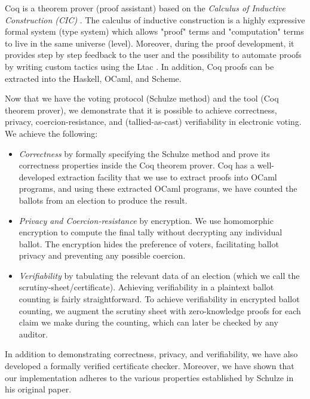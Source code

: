 Coq is a theorem prover (proof assistant) based on the \textit{Calculus of Inductive Construction (CIC)} 
\citep{Coquand:1988:CC:47724.47725} \citep{coquand1988inductively}. 
The calculus of inductive construction is a highly expressive formal system (type system) 
which allows "proof" terms and 
"computation" terms to live in the same universe (level). Moreover, during the proof development, 
it provides step by step feedback to the user and the possibility to automate proofs by 
writing custom tactics using the Ltac \citep{10.5555/1765236.1765246}. In addition, 
Coq proofs can be extracted into the  Haskell, OCaml, and Scheme.
 
Now that we have the voting protocol (Schulze method) and  the tool (Coq theorem prover), 
we demonstrate that it is possible to achieve correctness, privacy, coercion-resistance, and (tallied-as-cast) verifiability in 
electronic voting. We achieve the following:
\begin{itemize}
 \item \textit{Correctness} by formally specifying the Schulze method  and prove its correctness properties
  inside the Coq theorem prover. 
 Coq has a well-developed extraction facility that 
 we use to extract proofs into OCaml programs, and using these extracted OCaml programs, we 
 have counted the ballots from an election to produce the result. 
 \item \textit{Privacy and Coercion-resistance} by encryption. We use homomorphic encryption to compute the 
  final tally without decrypting any individual ballot.  The encryption hides the preference of voters, facilitating 
  ballot privacy and preventing any possible coercion.  
  
\item \textit{Verifiability} by tabulating the relevant data of an election (which we call the scrutiny-sheet/certificate).
   Achieving verifiability in a plaintext ballot counting is fairly straightforward. 
   To achieve verifiability in encrypted ballot counting, 
   we augment the scrutiny sheet with zero-knowledge proofs for each claim we make during the 
   counting, which can  later be checked by any auditor.  
\end{itemize}



In addition to demonstrating correctness, privacy, and verifiability, we have also developed a formally verified certificate 
checker. Moreover, we have shown that our implementation adheres to the various properties established by Schulze in 
his original paper. 

